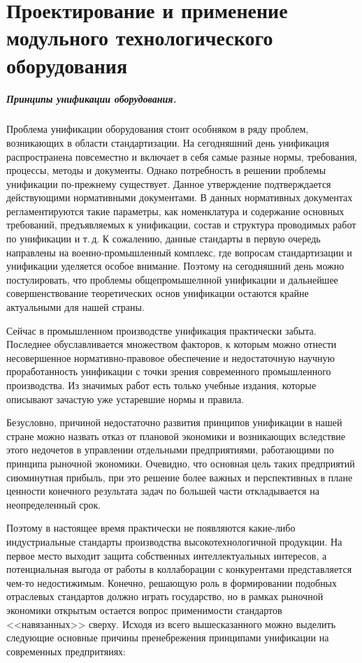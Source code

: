 \chapter{Проектирование и применение модульного технологического оборудования}\label{ch:ch2}

\paragraph{Принципы унификации оборудования.}

Проблема унификации оборудования стоит особняком в ряду проблем, возникающих в области стандартизации. На сегодняшний день унификация распространена повсеместно и включает в себя самые разные нормы, требования, процессы, методы и документы. Однако потребность в решении проблемы унификации по-прежнему существует. Данное утверждение подтверждается действующими нормативными документами. В данных нормативных документах регламентируются такие параметры, как номенклатура и содержание основных требований, предъявляемых к унификации, состав и структура проводимых работ по унификации и т.\,д. К сожалению, данные стандарты в первую очередь направлены на военно-промышленный комплекс, где вопросам стандартизации и унификации уделяется особое внимание. Поэтому на сегодняшний день можно постулировать, что проблемы общепромышелнной унификации и дальнейшее совершенствование теоретических основ унификации остаются крайне актуальными для нашей страны. 

Сейчас в промышленном производстве унификация практически забыта. Последнее обуславливается множеством факторов, к которым можно отнести несовершенное нормативно-правовое обеспечение и недостаточную научную проработанность унификации с точки зрения современного промышленного производства. Из значимых работ есть только учебные издания, которые описывают зачастую уже устаревшие нормы и правила. 

Безусловно, причиной недостаточно развития принципов унификации в нашей стране можно назвать отказ от плановой экономики и возникающих вследствие этого недочетов в управлении отдельными предприятиями, работающими по принципа рыночной экономики. Очевидно, что основная цель таких предприятий сиюминутная прибыль, при это решение более важных и перспективных в плане ценности конечного результата задач по большей части откладывается на неопределенный срок. 

Поэтому в настоящее время практически не появляются какие-либо индустриальные стандарты производства высокотехнологичной продукции. На первое место выходит защита собственных интеллектуальных интересов, а потенциальная выгода от работы в коллаборации с конкурентами представляется чем-то недостижимым. Конечно, решающую роль в формировании подобных отраслевых стандартов должно играть государство, но в рамках рыночной экономики открытым остается вопрос применимости стандартов <<навязанных>> сверху. Исходя из всего вышесказанного можно выделить следующие основные причины пренебрежения принципами унификации на современных предпритяиях:

